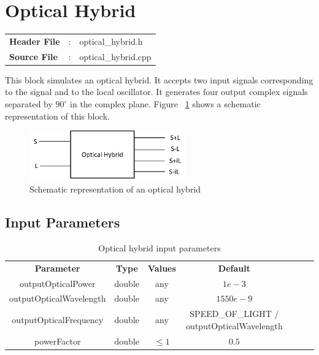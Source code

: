 \clearpage

\section{Optical Hybrid}

\begin{tcolorbox}	
	\begin{tabular}{p{2.75cm} p{0.2cm} p{10.5cm}} 	
		\textbf{Header File}   &:& optical\_hybrid.h \\
		\textbf{Source File}   &:& optical\_hybrid.cpp \\
	\end{tabular}
\end{tcolorbox}

This block simulates an optical hybrid. It accepts two input signals corresponding to the signal and to the local oscillator. It generates four output complex signals separated by $90^\circ$ in the complex plane. Figure ~\ref{opticalhybrid} shows a schematic representation of this block.

\begin{figure}[h]
	\centering\includegraphics[width=0.6\textwidth]{./lib/optical_hybrid/figures/optical_hybrid_block_diagram.png}
	\caption{Schematic representation of an optical hybrid}\label{opticalhybrid}
\end{figure}

\subsection*{Input Parameters}

\begin{table}[h]
	\centering
	\begin{tabular}{|c|c|c|c|ccp{60mm}}
		\cline{1-4}
		\textbf{Parameter} & \textbf{Type} & \textbf{Values} &   \textbf{Default}& \\ \cline{1-4}
		outputOpticalPower & double & any & $1e-3$ \\ \cline{1-4}
		outputOpticalWavelength & double & any & $1550e-9$ \\ \cline{1-4}
		outputOpticalFrequency & double & any & SPEED\_OF\_LIGHT / outputOpticalWavelength \\ \cline{1-4}
		powerFactor & double & $\leq 1$ & $0.5$ \\ \cline{1-4} 
	\end{tabular}
	\caption{Optical hybrid input parameters}
	\label{table:optical_hybrid_in_par}
\end{table}

